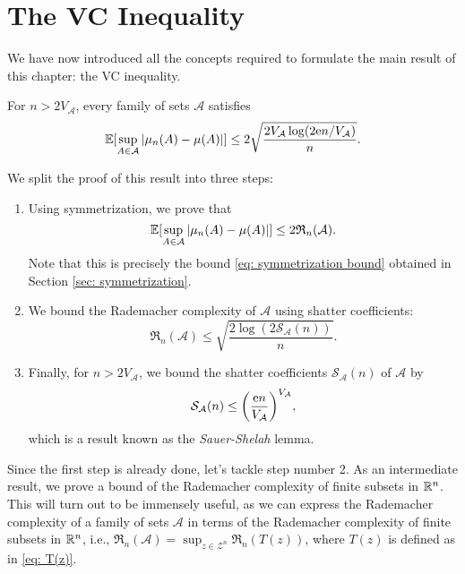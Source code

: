\section{The VC Inequality}
\label{sec: VC inequality}

We have now introduced all the concepts required to formulate the main result of this chapter: the VC inequality.

\begin{theorem}[VC Inequality]
\label{thm: VC inequality}
For $n > 2 V_{\mathcal{A}}$, every family of sets $\mathcal{A}$ satisfies
\[
    \operatorname{\mathbb{E}}[\sup_{A \in \mathcal{A}} \abs{\mu_n(A) - \mu(A)}] \leq 2 \sqrt{\frac{2 V_{\mathcal{A}} \log(2\mathrm{e} n / V_{\mathcal{A}})}{n}}.
\]
\end{theorem}

We split the proof of this result into three steps:

\begin{enumerate}
    \item Using symmetrization, we prove that
    \[
        \operatorname{\mathbb{E}}[\sup_{A \in \mathcal{A}} \abs{\mu_n(A) - \mu(A)}] \leq 2 \mathfrak{R}_n(\mathcal{A}).
    \]
    Note that this is precisely the bound \eqref{eq: symmetrization bound} obtained in Section \ref{sec: symmetrization}.

    \item We bound the Rademacher complexity of $\mathcal{A}$ using shatter coefficients:
    \[
        \mathfrak{R}_n(\mathcal{A}) \leq \sqrt{\frac{2 \log(2 \mathcal{S}_{\mathcal{A}}(n))}{n}}.
    \]

    \item Finally, for $n > 2 V_{\mathcal{A}}$, we bound the shatter coefficients $\mathcal{S}_{\mathcal{A}}(n)$ of $\mathcal{A}$ by
    \[
        \mathcal{S}_{\mathcal{A}}(n) \leq \left(\frac{\e n}{V_{\mathcal{A}}}\right)^{V_{\mathcal{A}}},
    \]
    which is a result known as the \emph{Sauer-Shelah} lemma.
\end{enumerate}

Since the first step is already done, let's tackle step number 2. As an intermediate result, we prove a bound of the Rademacher complexity of finite subsets in $\mathbb{R}^n$. This will turn out to be immensely useful, as we can express the Rademacher complexity of a family of sets $\mathcal{A}$ in terms of the Rademacher complexity of finite subsets in $\mathbb{R}^n$, i.e., $\mathfrak{R}_n(\mathcal{A}) = \sup_{z \in \mathcal{Z}^n} \mathfrak{R}_n(T(z))$, where $T(z)$ is defined as in \eqref{eq: T(z)}.


